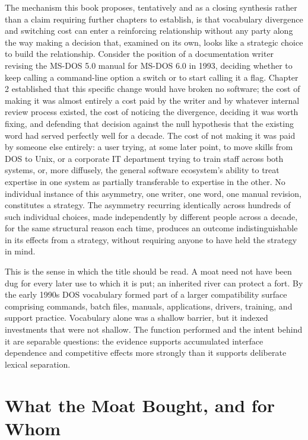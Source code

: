 \documentclass[11pt]{book}
\begin{document}
The mechanism this book proposes, tentatively and as a closing synthesis rather than a claim requiring further chapters to establish, is that vocabulary divergence and switching cost can enter a reinforcing relationship without any party along the way making a decision that, examined on its own, looks like a strategic choice to build the relationship. Consider the position of a documentation writer revising the MS-DOS 5.0 manual for MS-DOS 6.0 in 1993, deciding whether to keep calling a command-line option a switch or to start calling it a flag. Chapter 2 established that this specific change would have broken no software; the cost of making it was almost entirely a cost paid by the writer and by whatever internal review process existed, the cost of noticing the divergence, deciding it was worth fixing, and defending that decision against the null hypothesis that the existing word had served perfectly well for a decade. The cost of not making it was paid by someone else entirely: a user trying, at some later point, to move skills from DOS to Unix, or a corporate IT department trying to train staff across both systems, or, more diffusely, the general software ecosystem's ability to treat expertise in one system as partially transferable to expertise in the other. No individual instance of this asymmetry, one writer, one word, one manual revision, constitutes a strategy. The asymmetry recurring identically across hundreds of such individual choices, made independently by different people across a decade, for the same structural reason each time, produces an outcome indistinguishable in its effects from a strategy, without requiring anyone to have held the strategy in mind.

This is the sense in which the title should be read. A moat need not have been dug for every later use to which it is put; an inherited river can protect a fort. By the early 1990s DOS vocabulary formed part of a larger compatibility surface comprising commands, batch files, manuals, applications, drivers, training, and support practice. Vocabulary alone was a shallow barrier, but it indexed investments that were not shallow. The function performed and the intent behind it are separable questions: the evidence supports accumulated interface dependence and competitive effects more strongly than it supports deliberate lexical separation.

\section{What the Moat Bought, and for Whom}
\end{document}
